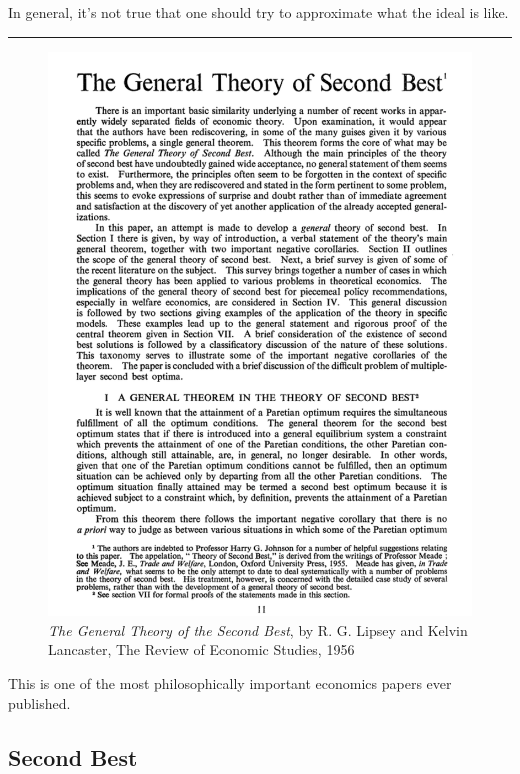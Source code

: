 \documentclass[
  11pt,
  letterpaper,
  DIV=11,
  numbers=noendperiod,
  oneside]{scrartcl}
\begin{document}
In general, it's not true that one should try to approximate what the
ideal is like.

\begin{center}\rule{0.5\linewidth}{0.5pt}\end{center}

\begin{figure}[H]

{\centering \includegraphics{lipsey.png}

}

\caption{\emph{The General Theory of the Second Best}, by R. G. Lipsey
and Kelvin Lancaster, The Review of Economic Studies, 1956}

\end{figure}%

This is one of the most philosophically important economics papers ever
published.

\subsection{Second Best}\label{second-best}
\end{document}
